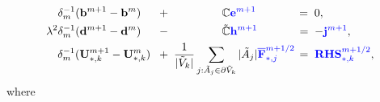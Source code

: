 \documentclass{report}
\begin{document}
\begin{align}
    \delta_m^{-1} (\mathbf{b}^{m+1} - \mathbf{b}^{m}) \hspace{0.4cm}&\;+\; \hspace{1.5cm}\mathbb{C}\textcolor{blue}{\mathbf{e}^{m+1}}\hspace{1.25cm}=\; 0, \label{equ:maxwell_faraday_ap}\\
    \lambda^2\delta_m^{-1}(\mathbf{d}^{m+1} - \mathbf{d}^m) \hspace{0.4cm}&\;-\; \hspace{1.5cm}\Tilde{\mathbb{C}}\textcolor{blue}{\mathbf{h}^{m+1}} \hspace{1.22cm}=\; - \textcolor{blue}{\mathbf{j}^{m+1}}, \label{equ:maxwell_ampere_ap}\\
    \delta_m^{-1}(\mathbf{U}_{*,k}^{m+1} - \mathbf{U}_{*,k}^{m}) \hspace{0.10cm}&\;+\;  \frac{1}{|\Tilde{V}_k|}\sum_{j:\Tilde{A}_j\in\partial\Tilde{V}_k}|\Tilde{A}_j|\textcolor{blue}{\overline{\mathbf{F}}_{*,j}^{m+1/2}} \hspace{0.05cm}=\; \textcolor{blue}{\mathbf{RHS}_{*,k}^{m+1/2}}, \label{equ:euler_ap}
\end{align}
where 
\end{document}

